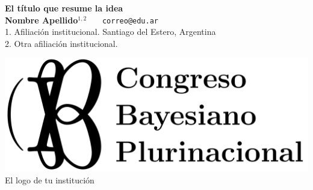 \documentclass[a0,portrait]{a0poster} %
\begin{document}
\centering \fontsize{90}{90} \textbf{El título que resume la idea} \\[0.5cm]  %
\LARGE \textbf{Nombre Apellido}$^{1,2}$  \ \ \  \texttt{correo@edu.ar} \\
\large 1. Afiliación institucional. Santiago del Estero, Argentina \\
\large 2. Otra afiliación institucional.\\


\vspace{1cm}

\includegraphics[width=0.2\linewidth]{../../logos/CBP.png} \\
\fontsize{55}{55}\selectfont El logo de tu institución \\[0.3cm]
\end{document}
